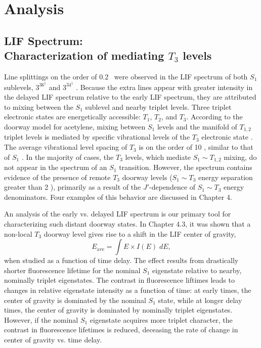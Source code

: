 \documentclass[12pt]{mitthesis}
\begin{document}
\section{Analysis}

\subsection{LIF Spectrum: \\Characterization of mediating $T_3$
  levels}

Line splittings on the order of $0.2$ \rcm\ were observed in the LIF
spectrum of both $S_1$ sublevels, $3^36^1$  and $3^34^1$ .
Because the extra lines appear with greater intensity in the delayed
LIF spectrum relative to the early LIF spectrum, they are attributed
to mixing between the $S_1$ sublevel and nearby triplet levels.  Three
triplet electronic states are energetically accessible: $T_1$, $T_2$,
and $T_3$.  According to the doorway model for acetylene, mixing
between $S_1$ levels and the manifold of $T_{1,2}$ triplet levels is
mediated by specific vibrational levels of the $T_3$ electronic state
\cite{dupre91, dupre95a, dupre95b, humphrey97, altunata00, mishra04}.
The average vibrational level spacing of $T_3$ is on the order of 10
\rcm, similar to that of $S_1$ \cite{thom07}.  In the majority of
cases, the $T_3$ levels, which mediate $S_1 \sim T_{1,2}$ mixing, do
not appear in the spectrum of an $S_1$ transition.  However, the
spectrum contains evidence of the presence of remote $T_3$ doorway
levels ($S_1 \sim T_3$ energy separation greater than 2 \rcm),
primarily as a result of the $J'$-dependence of $S_1 \sim T_3$ energy
denominators.  Four examples of this behavior are discussed in Chapter
4.

An analysis of the early vs. delayed LIF spectrum is our primary tool
for characterizing such distant doorway states.  In Chapter 4.3, it was
shown that a non-local $T_3$ doorway level gives rise to a shift in
the LIF center of gravity,
\begin{equation}
  E_{\text{ave}} = \int E \times I(E) \; dE,
\end{equation}
when studied as a function of time delay.  The effect results from
drastically shorter fluorescence lifetime for the nominal $S_1$
eigenstate relative to nearby, nominally triplet eigenstates.  The
contrast in fluorescence liftimes leads to changes in relative
eigenstate intensity as a function of time: at early times, the center
of gravity is dominated by the nominal $S_1$ state, while at longer
delay times, the center of gravity is dominated by nominally triplet
eigenstates.  However, if the nominal $S_1$ eigenstate acquires more
triplet character, the contrast in fluorescence lifetimes is reduced,
deceasing the rate of change in center of gravity vs. time delay.
\end{document}
